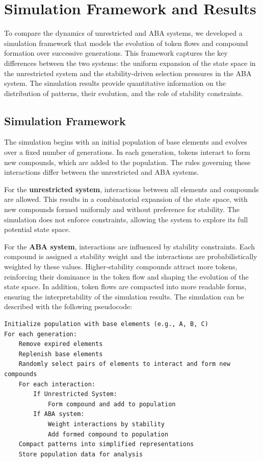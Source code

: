 \documentclass[entropy,article,submit,pdftex,oneauthor]{Definitions/mdpi}
\begin{document}
\section{Simulation Framework and Results}

To compare the dynamics of unrestricted and ABA systems, we developed a simulation framework that models the evolution of token flows and compound formation over successive generations. This framework captures the key differences between the two systems: the uniform expansion of the state space in the unrestricted system and the stability-driven selection pressures in the ABA system. The simulation results provide quantitative information on the distribution of patterns, their evolution, and the role of stability constraints.

\subsection{Simulation Framework}

The simulation begins with an initial population of base elements and evolves over a fixed number of generations. In each generation, tokens interact to form new compounds, which are added to the population. The rules governing these interactions differ between the unrestricted and ABA systems.

For the \textbf{unrestricted system}, interactions between all elements and compounds are allowed. This results in a combinatorial expansion of the state space, with new compounds formed uniformly and without preference for stability. The simulation does not enforce constraints, allowing the system to explore its full potential state space.

For the \textbf{ABA system}, interactions are influenced by stability constraints. Each compound is assigned a stability weight and the interactions are probabilistically weighted by these values. Higher-stability compounds attract more tokens, reinforcing their dominance in the token flow and shaping the evolution of the state space. In addition, token flows are compacted into more readable forms, ensuring the interpretability of the simulation results. The simulation can be described with the following pseudocode:

\scriptsize
\begin{center}
\begin{minipage}{0.7\textwidth}
\ttfamily
\begin{verbatim}
Initialize population with base elements (e.g., A, B, C)
For each generation:
    Remove expired elements
    Replenish base elements
    Randomly select pairs of elements to interact and form new compounds
    For each interaction:
        If Unrestricted System:
            Form compound and add to population
        If ABA system:
            Weight interactions by stability
            Add formed compound to population
    Compact patterns into simplified representations
    Store population data for analysis
\end{verbatim}
\end{minipage}
\end{center}
\normalsize
\end{document}
